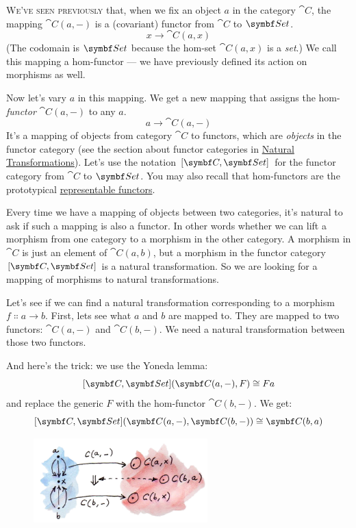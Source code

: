 
\lettrine[lhang=0.17]{W}{e've seen previously} that, when we fix an object $a$ in the
category $\cat{C}$, the mapping $\cat{C}(a, -)$ is a (covariant)
functor from $\cat{C}$ to $\Set$.
\[x \to \cat{C}(a, x)\]
(The codomain is $\Set$ because the hom-set $\cat{C}(a, x)$ is a
\emph{set}.) We call this mapping a hom-functor --- we have previously
defined its action on morphisms as well.

Now let's vary $a$ in this mapping. We get a new mapping that
assigns the hom-\emph{functor} $\cat{C}(a, -)$ to any $a$.
\[a \to \cat{C}(a, -)\]
It's a mapping of objects from category $\cat{C}$ to functors, which are
\emph{objects} in the functor category (see the section about functor
categories in
\hyperref[natural-transformations]{Natural
  Transformations}). Let's use the notation $[\cat{C}, \Set]$ for the
functor category from $\cat{C}$ to $\Set$. You may also recall that
hom-functors are the prototypical
\hyperref[representable-functors]{representable
  functors}.

Every time we have a mapping of objects between two categories, it's
natural to ask if such a mapping is also a functor. In other words
whether we can lift a morphism from one category to a morphism in the
other category. A morphism in $\cat{C}$ is just an element of
$\cat{C}(a, b)$, but a morphism in the functor category
$[\cat{C}, \Set]$ is a natural transformation. So we are looking
for a mapping of morphisms to natural transformations.

Let's see if we can find a natural transformation corresponding to a
morphism $f \Colon a \to b$. First, lets see what
$a$ and $b$ are mapped to. They are mapped to two
functors: $\cat{C}(a, -)$ and $\cat{C}(b, -)$. We need a natural
transformation between those two functors.

And here's the trick: we use the Yoneda lemma:
\[[\cat{C}, \Set](\cat{C}(a, -), F) \cong F a\]
and replace the generic $F$ with the hom-functor
$\cat{C}(b, -)$. We get:
\[[\cat{C}, \Set](\cat{C}(a, -), \cat{C}(b, -)) \cong \cat{C}(b, a)\]
\begin{figure}[H]
  \centering
  \includegraphics[width=0.6\textwidth]{images/yoneda-embedding.jpg}
\end{figure}

